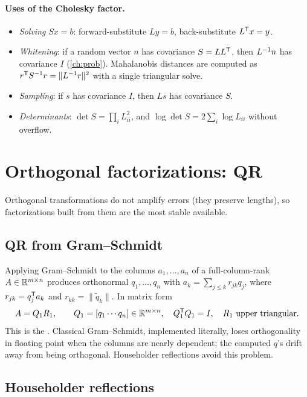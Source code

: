 \paragraph{Uses of the Cholesky factor.}
\begin{itemize}
  \item \emph{Solving} $Sx = b$: forward-substitute $Ly = b$, back-substitute $L^{\mathsf{T}} x = y$.
  \item \emph{Whitening}: if a random vector $n$ has covariance $S = LL^{\mathsf{T}}$, then $L^{-1} n$ has covariance $I$ (\cref{ch:prob}).
        Mahalanobis distances are computed as $r^{\mathsf{T}} S^{-1} r = \|L^{-1} r\|^2$ with a single triangular solve.
  \item \emph{Sampling}: if $s$ has covariance $I$, then $Ls$ has covariance $S$.
  \item \emph{Determinants}: $\det S = \prod_iL_{ii}^2$, and $\log\det S = 2\sum_i\log L_{ii}$ without overflow.
\end{itemize}

\section{Orthogonal factorizations: QR}

Orthogonal transformations do not amplify errors (they preserve lengths), so factorizations built from them are the most
stable available.

\subsection{QR from Gram--Schmidt}

Applying Gram--Schmidt to the columns $a_1, \dots, a_n$ of a full-column-rank $A \in \mathbb{R}^{m\times n}$ produces orthonormal $q_1, \dots, q_n$
with $a_k = \sum_{j\le k}r_{jk}q_j$, where $r_{jk} = q_j^{\mathsf{T}} a_k$ and $r_{kk} = \|\tilde q_k\|$. In matrix form
\begin{equation}
  A = Q_1R_1, \qquad Q_1 = [q_1 \cdots q_n] \in \mathbb{R}^{m\times n},\quad Q_1^{\mathsf{T}} Q_1 = I,\quad R_1 \text{ upper triangular}.
\end{equation}
This is the . Classical Gram--Schmidt, implemented literally, loses orthogonality in floating point when the
columns are nearly dependent; the computed $q$'s drift away from being orthogonal. Householder reflections avoid this problem.

\subsection{Householder reflections}

